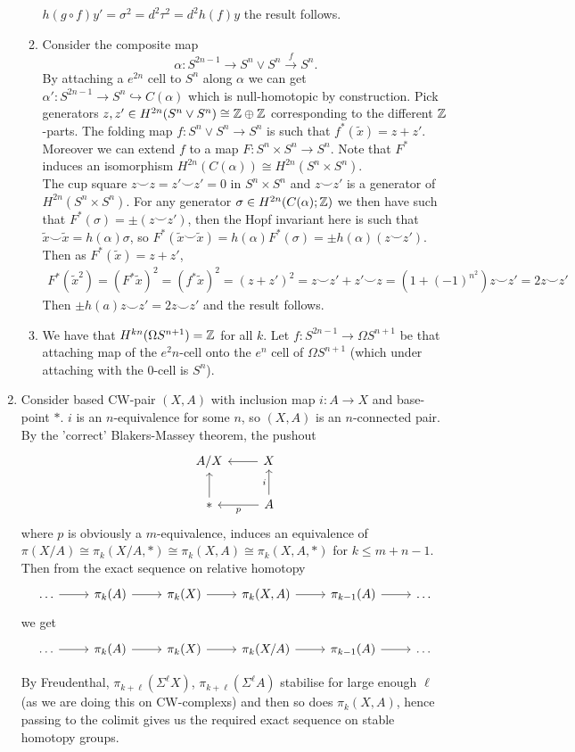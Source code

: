 \documentclass[10pt,a4paper]{article}
\begin{document}
\begin{enumerate}
\begin{enumerate}
$h(g\circ f) y'=\sigma^2=d^2 \tau^2 = d^2h(f)y$ the result follows.
\item Consider the composite map 
\[\alpha:S^{2n-1}\to S^n\vee S^n\xrightarrow{f} S^n.\]
By attaching a $e^{2n}$ cell to $S^n$ along $\alpha$ we can get $\alpha':S^{2n-1}\to S^n\hookrightarrow{}C(\alpha)$ which is null-homotopic by construction. 
Pick generators $z,z'\in H^{2n}(S^n\vee S^n) \cong \mathbb{Z}\oplus \mathbb{Z}$ corresponding to the different $\mathbb{Z}$-parts. The folding map $f:S^n\vee S^n \to S^n$ is such that $f^*(\tilde{x}) = z+z'$. Moreover we can extend $f$ to a map $F:S^n\times S^n\to S^n$. Note that $F^*$ induces an isomorphism $H^{2n}(C(\alpha)) \cong H^{2n}(S^n\times S^n)$.\\
The cup square $z\smile z = z'\smile z' = 0$ in $S^n\times S^n$ and $z\smile z'$ is a generator of $H^{2n}(S^n\times S^n)$. For any generator $\sigma\in H^{2n}(C(\alpha);\mathbb{Z})$ we then have such that $F^*(\sigma) = \pm(z\smile z')$, then the Hopf invariant here is such that $\tilde{x}\smile \tilde{x} = h(\alpha)\sigma$, so $F^* (\tilde{x}\smile\tilde{x}) = h(\alpha)F^*(\sigma) = \pm h(\alpha)(z \smile z')$.
Then as $F^*(\tilde{x}) = z+z'$, 
\begin{align*}
F^*(\tilde{x}^2) = (F^* \tilde{x})^2 = (f^* \tilde{x})^2  = (z+ z')^2 = z\smile z'+z'\smile z = (1+(-1)^{n^2})z\smile z' = 2z\smile z'
\end{align*}	
Then $\pm h(a)z\smile z' = 2z\smile z'$ and the result follows.
\item We have that $H^{kn}(\Omega S^{n+1}) = \mathbb{Z}$ for all $k$. Let $f:S^{2n-1}\to \Omega S^{n+1}$ be that attaching map of the $e^2n$-cell onto the $e^n$ cell of $\Omega S^{n+1}$ (which under attaching with the 0-cell is $S^n$).
\end{enumerate}
\item Consider based CW-pair $(X,A)$ with inclusion map $i:A\to X$ and base-point $*$. $i$ is an $n$-equivalence for some $n$, so $(X,A)$ is an $n$-connected pair.
By the 'correct' Blakers-Massey theorem, the pushout 
\[\begin{tikzcd}
A/X & X\arrow{l}\\
* \arrow{u} & A \arrow[u,"i"]\arrow[l,"p"]
\end{tikzcd}\]
where $p$ is obviously a $m$-equivalence, induces an equivalence of $\pi(X/A) \cong \pi_k(X/A, *) \cong \pi_k(X,A)\cong \pi_k(X,A,*)$ for $k\leq m+n-1$. Then from the exact sequence on relative homotopy
\[\begin{tikzcd}
\ldots\arrow{r}& \pi_k(A)\arrow{r}& \pi_k(X)\arrow{r}& \pi_k(X,A)\arrow{r}& \pi_{k-1}(A)\arrow{r}&\ldots
\end{tikzcd}\]
we get
\[\begin{tikzcd}
\ldots\arrow{r}& \pi_k(A)\arrow{r}& \pi_k(X)\arrow{r}& \pi_k(X/A)\arrow{r}& \pi_{k-1}(A)\arrow{r}&\ldots
\end{tikzcd}\]

By Freudenthal, $\pi_{k+\ell}(\Sigma^\ell X)$, $\pi_{k+\ell}(\Sigma^\ell A)$ stabilise for large enough $\ell$ (as we are doing this on CW-complexs) and then so does $\pi_k(X,A)$, hence passing to the colimit gives us the required exact sequence on stable homotopy groups.
\end{enumerate}
\end{document}
